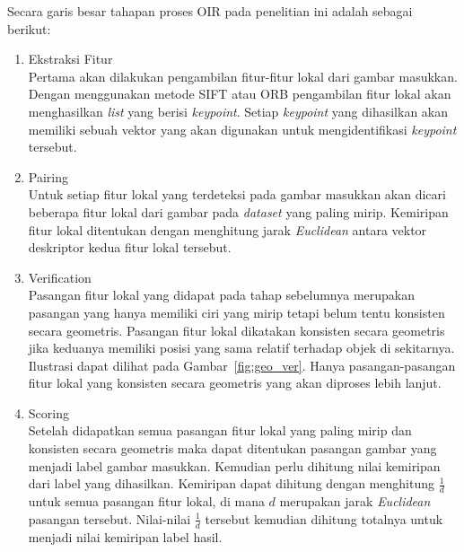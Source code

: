 Secara garis besar tahapan proses OIR pada penelitian ini adalah sebagai berikut:
\begin{enumerate}
	\item Ekstraksi Fitur \\
	Pertama akan dilakukan pengambilan fitur-fitur lokal dari gambar masukkan. Dengan menggunakan metode SIFT atau ORB pengambilan fitur lokal akan menghasilkan \textit{list} yang  berisi \textit{keypoint}. Setiap \textit{keypoint} yang dihasilkan akan memiliki sebuah vektor yang akan digunakan untuk mengidentifikasi \textit{keypoint} tersebut.
	\item Pairing \\
	Untuk setiap fitur lokal yang terdeteksi pada gambar masukkan akan dicari beberapa fitur lokal dari gambar pada \textit{dataset} yang paling mirip. Kemiripan fitur lokal ditentukan dengan menghitung jarak \textit{Euclidean} antara vektor deskriptor kedua fitur lokal tersebut.
	\item Verification \\
	Pasangan fitur lokal yang didapat pada tahap sebelumnya merupakan pasangan yang hanya memiliki ciri yang mirip tetapi belum tentu konsisten secara geometris. Pasangan fitur lokal dikatakan konsisten secara geometris jika keduanya memiliki posisi yang sama relatif terhadap objek di sekitarnya. Ilustrasi dapat dilihat pada Gambar~\ref{fig:geo_ver}. Hanya pasangan-pasangan fitur lokal yang konsisten secara geometris yang akan diproses lebih lanjut.
	\item Scoring \\
	Setelah didapatkan semua pasangan fitur lokal yang paling mirip dan konsisten secara geometris maka dapat ditentukan pasangan gambar yang menjadi label gambar masukkan. Kemudian perlu dihitung nilai kemiripan dari label yang dihasilkan. Kemiripan dapat dihitung dengan menghitung $\frac{1}{d}$ untuk semua pasangan fitur lokal, di mana $d$ merupakan jarak \textit{Euclidean} pasangan tersebut. Nilai-nilai $\frac{1}{d}$ tersebut kemudian dihitung totalnya untuk menjadi nilai kemiripan label hasil.
	
\end{enumerate}

